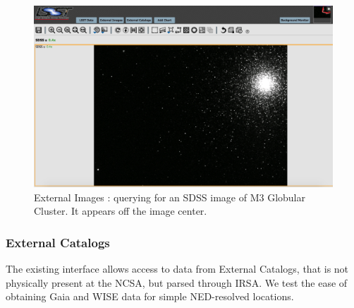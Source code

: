 \documentclass[DM,lsstdraft,toc]{lsstdoc}
\begin{document}
\begin{figure}
\includegraphics[width=\textwidth]{figs/external_images_m3.png}
\caption{External Images : querying for an SDSS image of M3 Globular Cluster. It appears off the image center.}
\label{fig:ext_images_m3}
\end{figure}



\subsubsection{External Catalogs}
\label{sec:ext_catalogs}

The existing interface allows access to data from External Catalogs,  that is not physically present at the NCSA, but parsed through IRSA. We test the ease of obtaining Gaia and WISE data for simple NED-resolved locations.
\end{document}
